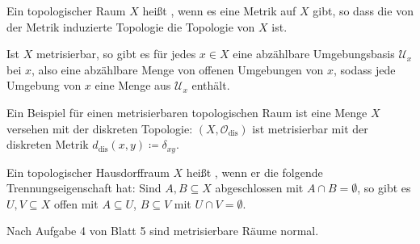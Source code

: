 \begin{definition}[{name=[metrisierbarer Raum]}]
	Ein topologischer Raum $X$ heißt , wenn es eine Metrik auf $X$ gibt, so dass die von der Metrik induzierte Topologie die Topologie von $X$ ist.
\end{definition}

Ist $X$ metrisierbar, so gibt es für jedes $x \in X$ eine abzählbare Umgebungsbasis $\mathcal{U}_x$ bei $x$, also eine abzählbare Menge von offenen Umgebungen von $x$, sodass jede Umgebung von $x$ eine Menge aus $\mathcal{U}_x$ enthält. 

Ein Beispiel für einen metrisierbaren topologischen Raum ist eine Menge $X$ versehen mit der diskreten Topologie:
$(X, \mathcal{O}_{\text{dis}})$ ist metrisierbar mit der diskreten Metrik $d_{\text{dis}}(x,y) \coloneqq \delta_{xy}$.

\begin{definition}[{name=[normaler Hausdorffraum]}]
	Ein topologischer Hausdorffraum $X$ heißt , wenn er die folgende Trennungseigenschaft hat: Sind $A,B \subseteq X$ abgeschlossen mit $A \cap B = \emptyset$, so gibt es $U,V \subseteq X$ offen mit $A \subseteq U$, $B \subseteq V$ mit $U \cap V = \emptyset$.
\end{definition}

Nach Aufgabe 4 von Blatt 5 sind metrisierbare Räume normal.

